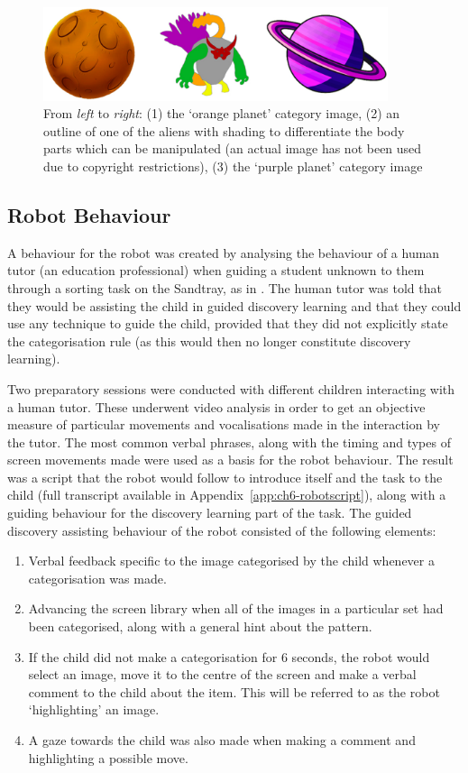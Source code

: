 \begin{figure}[t!]
    \centering
    \includegraphics[width=0.9\textwidth]{images/ch6_Combined.pdf}
    \caption{From \textit{left} to \textit{right}: (1) the `orange planet' category image, (2) an outline of one of the aliens with shading to differentiate the body parts which can be manipulated (an actual image has not been used due to copyright restrictions), (3) the `purple planet' category image}
    \label{fig:ch6-alienandcats}
\end{figure}

\subsection{Robot Behaviour}\label{sec:ch6-meth-robobehave}
A behaviour for the robot was created by analysing the behaviour of a human tutor (an education professional) when guiding a student unknown to them through a sorting task on the Sandtray, as in \cite{kennedy2013constraining}. The human tutor was told that they would be assisting the child in guided discovery learning and that they could use any technique to guide the child, provided that they did not explicitly state the categorisation rule (as this would then no longer constitute discovery learning). 

Two preparatory sessions were conducted with different children interacting with a human tutor. These underwent video analysis in order to get an objective measure of particular movements and vocalisations made in the interaction by the tutor. The most common verbal phrases, along with the timing and types of screen movements made were used as a basis for the robot behaviour. The result was a script that the robot would follow to introduce itself and the task to the child (full transcript available in Appendix~\ref{app:ch6-robotscript}), along with a guiding behaviour for the discovery learning part of the task. The guided discovery assisting behaviour of the robot consisted of the following elements:

\begin{enumerate}
	\item Verbal feedback specific to the image categorised by the child whenever a categorisation was made.
	\item Advancing the screen library when all of the images in a particular set had been categorised, along with a general hint about the pattern.
	\item If the child did not make a categorisation for 6 seconds, the robot would select an image, move it to the centre of the screen and make a verbal comment to the child about the item. This will be referred to as the robot `highlighting' an image.
	\item A gaze towards the child was also made when making a comment and highlighting a possible move.
\end{enumerate}

